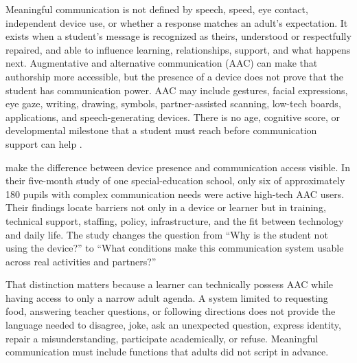 
Meaningful communication is not defined by speech, speed, eye contact, independent device use, or whether a response matches an adult's expectation. It exists when a student's message is recognized as theirs, understood or respectfully repaired, and able to influence learning, relationships, support, and what happens next. Augmentative and alternative communication (AAC) can make that authorship more accessible, but the presence of a device does not prove that the student has communication power. AAC may include gestures, facial expressions, eye gaze, writing, drawing, symbols, partner-assisted scanning, low-tech boards, applications, and speech-generating devices. There is no age, cognitive score, or developmental milestone that a student must reach before communication support can help \citep{ashaAAC}.

\citet{norrie2021context} make the difference between device presence and communication access visible. In their five-month study of one special-education school, only six of approximately 180 pupils with complex communication needs were active high-tech AAC users. Their findings locate barriers not only in a device or learner but in training, technical support, staffing, policy, infrastructure, and the fit between technology and daily life. The study changes the question from ``Why is the student not using the device?'' to ``What conditions make this communication system usable across real activities and partners?''

That distinction matters because a learner can technically possess AAC while having access to only a narrow adult agenda. A system limited to requesting food, answering teacher questions, or following directions does not provide the language needed to disagree, joke, ask an unexpected question, express identity, repair a misunderstanding, participate academically, or refuse. Meaningful communication must include functions that adults did not script in advance.
